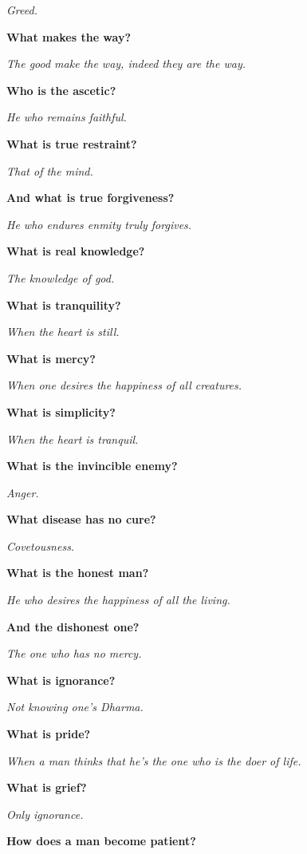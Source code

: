 \textit{Greed.}\medskip

\textbf{What makes the way?}

\textit{The good make the way, indeed they are the way.}\medskip

\textbf{Who is the ascetic?}

\textit{He who remains faithful.}\medskip

\textbf{What is true restraint?}

\textit{That of the mind.}\medskip

\textbf{And what is true forgiveness?}

\textit{He who endures enmity truly forgives.}\medskip

\textbf{What is real knowledge?}

\textit{The knowledge of god.}\medskip

\textbf{What is tranquility?}

\textit{When the heart is still.}\medskip

\textbf{What is mercy?}

\textit{When one desires the happiness of all creatures.}\medskip

\textbf{What is simplicity?}

\textit{When the heart is tranquil.}\medskip

\textbf{What is the invincible enemy?}

\textit{Anger.}\medskip

\textbf{What disease has no cure?}

\textit{Covetousness.}\medskip

\textbf{What is the honest man?}

\textit{He who desires the happiness of all the living.}\medskip\vfill\pagebreak\vspace*{1.2cm}

\textbf{And the dishonest one?}

\textit{The one who has no mercy.}\medskip

\textbf{What is ignorance?}

\textit{Not knowing one's Dharma.}\medskip

\textbf{What is pride?}

\textit{When a man thinks that he's the one who is the doer of life.}\medskip

\textbf{What is grief?}

\textit{Only ignorance.}\medskip

\textbf{How does a man become patient?}

